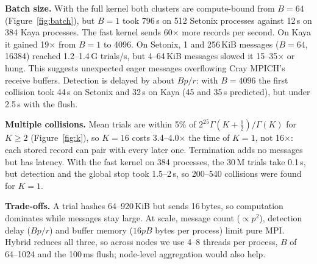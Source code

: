 \documentclass[10pt,a4paper]{article}
\begin{document}
\textbf{Batch size.} With the full kernel both clusters are compute-bound from $B{=}64$
(Figure~\ref{fig:batch}), but $B{=}1$ took 796\,s on 512 Setonix processes against 12\,s on 384
Kaya processes. The fast kernel sends 60$\times$ more records per second. On Kaya it gained
19$\times$ from $B{=}1$ to 4096. On Setonix, 1 and 256\,KiB messages ($B{=}64$, 16384) reached
1.2--1.4\,G trials/s, but 4--64\,KiB messages slowed it 15--35$\times$ or hung. This suggests
unexpected eager messages overflowing Cray MPICH's receive buffers. Detection is delayed by about
$Bp/r$: with $B{=}4096$ the first collision took 44\,s on Setonix and 32\,s on Kaya (45 and 35\,s
predicted), but under 2.5\,s with the flush.

\textbf{Multiple collisions.} Mean trials are within 5\% of $2^{25}\Gamma(K{+}\frac12)/\Gamma(K)$ for
$K\ge2$ (Figure~\ref{fig:k}), so $K{=}16$ costs 3.4--4.0$\times$ the time of $K{=}1$, not 16$\times$:
each stored record can pair with every later one. Termination adds no messages but has latency. With
the fast kernel on 384 processes, the 30\,M trials take 0.1\,s, but detection and the global stop took
1.5--2\,s, so 200--540 collisions were found for $K{=}1$.

\textbf{Trade-offs.} A trial hashes 64--920\,KiB but sends 16\,bytes, so computation dominates while
messages stay large. At scale, message count ($\propto p^2$), detection delay ($Bp/r$) and buffer
memory ($16pB$ bytes per process) limit pure MPI. Hybrid reduces all three, so across nodes we use
4--8 threads per process, $B$ of 64--1024 and the 100\,ms flush; node-level aggregation would also
help.
\end{document}
